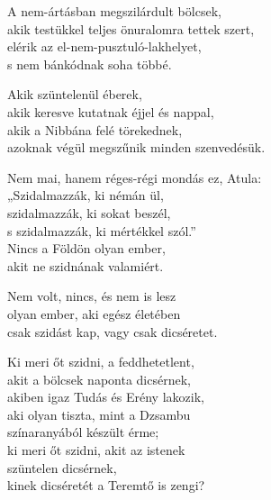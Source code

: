 \begin{dhpverse}

 A nem-ártásban megszilárdult bölcsek,\\
akik testükkel teljes önuralomra tettek szert,\\
elérik az el-nem-pusztuló-lakhelyet,\\
s nem bánkódnak soha többé.

 Akik szüntelenül éberek,\\
akik keresve kutatnak éjjel és nappal,\\
akik a Nibbána felé törekednek,\\
azoknak végül megszűnik minden szenvedésük.

 Nem mai, hanem réges-régi mondás ez, Atula:\\
„Szidalmazzák, ki némán ül,\\
szidalmazzák, ki sokat beszél,\\
s szidalmazzák, ki mértékkel szól.”\\
Nincs a Földön olyan ember,\\
akit ne szidnának valamiért.

 Nem volt, nincs, és nem is lesz\\
olyan ember, aki egész életében\\
csak szidást kap, vagy csak dicséretet.

 Ki meri őt szidni, a feddhetetlent,\\
akit a bölcsek naponta dicsérnek,\\
akiben igaz Tudás és Erény lakozik,\\
aki olyan tiszta, mint a Dzsambu\\
színaranyából készült érme;\\
ki meri őt szidni, akit az istenek\\
szüntelen dicsérnek,\\
kinek dicséretét a Teremtő is zengi?

\end{dhpverse}
\newpage
